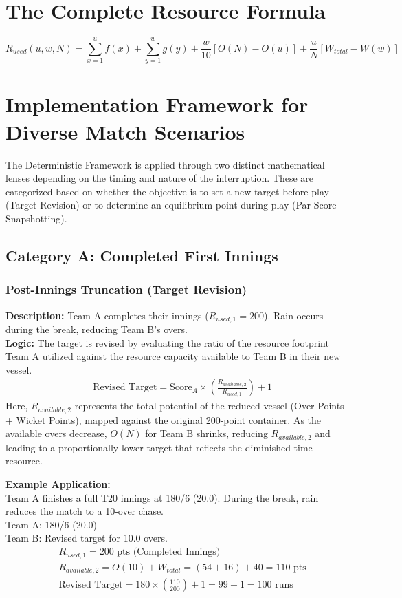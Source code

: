 \documentclass[12pt, letterpaper, fleqn]{article}
\begin{document}
\section{The Complete Resource Formula}

\begin{equation}
R_{used}(u, w, N) = \sum_{x=1}^{u} f(x) + \sum_{y=1}^{w} g(y) + \frac{w}{10} [O(N) - O(u)] + \frac{u}{N} [W_{total} - W(w)]
\end{equation}

\section{Implementation Framework for Diverse Match Scenarios}

\indent The Deterministic Framework is applied through two distinct mathematical lenses depending on the timing and nature of the interruption. These are categorized based on whether the objective is to set a new target before play (Target Revision) or to determine an equilibrium point during play (Par Score Snapshotting).

\subsection{Category A: Completed First Innings}

\subsubsection{Post-Innings Truncation (Target Revision)}
\indent \textbf{Description:} Team A completes their innings ($R_{used,1} = 200$). Rain occurs during the break, reducing Team B's overs. \\
\indent \textbf{Logic:} The target is revised by evaluating the ratio of the resource footprint Team A utilized against the resource capacity available to Team B in their new vessel.
\begin{align*}
& \text{Revised Target} = \text{Score}_A \times \left( \frac{R_{available,2}}{R_{used,1}} \right) + 1
\end{align*}
\indent Here, $R_{available,2}$ represents the total potential of the reduced vessel (Over Points + Wicket Points), mapped against the original 200-point container. As the available overs decrease, $O(N)$ for Team B shrinks, reducing $R_{available,2}$ and leading to a proportionally lower target that reflects the diminished time resource.

\indent \textbf{Example Application:} \\
Team A finishes a full T20 innings at 180/6 (20.0). During the break, rain reduces the match to a 10-over chase. \\
Team A: 180/6 (20.0) \\
Team B: Revised target for 10.0 overs.
\begin{align*}
& R_{used,1} = 200 \text{ pts (Completed Innings)} \\
& R_{available,2} = O(10) + W_{total} = (54 + 16) + 40 = 110 \text{ pts} \\
& \text{Revised Target} = 180 \times \left( \frac{110}{200} \right) + 1 = 99 + 1 = 100 \text{ runs}
\end{align*}
\end{document}
